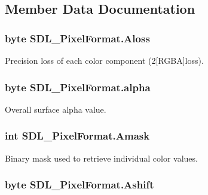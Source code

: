 \subsection{Member Data Documentation}
\hypertarget{struct_s_d_l___pixel_format_af56c52509223f7ba9a9e3424622f64eb}{
\subsubsection[{Aloss}]{\setlength{\rightskip}{0pt plus 5cm}byte {\bf SDL\_\-PixelFormat.Aloss}}}
\label{struct_s_d_l___pixel_format_af56c52509223f7ba9a9e3424622f64eb}


Precision loss of each color component (2\mbox{[}RGBA\mbox{]}loss). 

\hypertarget{struct_s_d_l___pixel_format_ac0061b3c0c1a204355fb51aba66ff830}{
\subsubsection[{alpha}]{\setlength{\rightskip}{0pt plus 5cm}byte {\bf SDL\_\-PixelFormat.alpha}}}
\label{struct_s_d_l___pixel_format_ac0061b3c0c1a204355fb51aba66ff830}


Overall surface alpha value. 

\hypertarget{struct_s_d_l___pixel_format_a8016d769695a8ce1deee3f44aeb96fa6}{
\subsubsection[{Amask}]{\setlength{\rightskip}{0pt plus 5cm}int {\bf SDL\_\-PixelFormat.Amask}}}
\label{struct_s_d_l___pixel_format_a8016d769695a8ce1deee3f44aeb96fa6}


Binary mask used to retrieve individual color values. 

\hypertarget{struct_s_d_l___pixel_format_a2040187299e831186e04ac50c5dfba33}{
\subsubsection[{Ashift}]{\setlength{\rightskip}{0pt plus 5cm}byte {\bf SDL\_\-PixelFormat.Ashift}}}
\label{struct_s_d_l___pixel_format_a2040187299e831186e04ac50c5dfba33}


